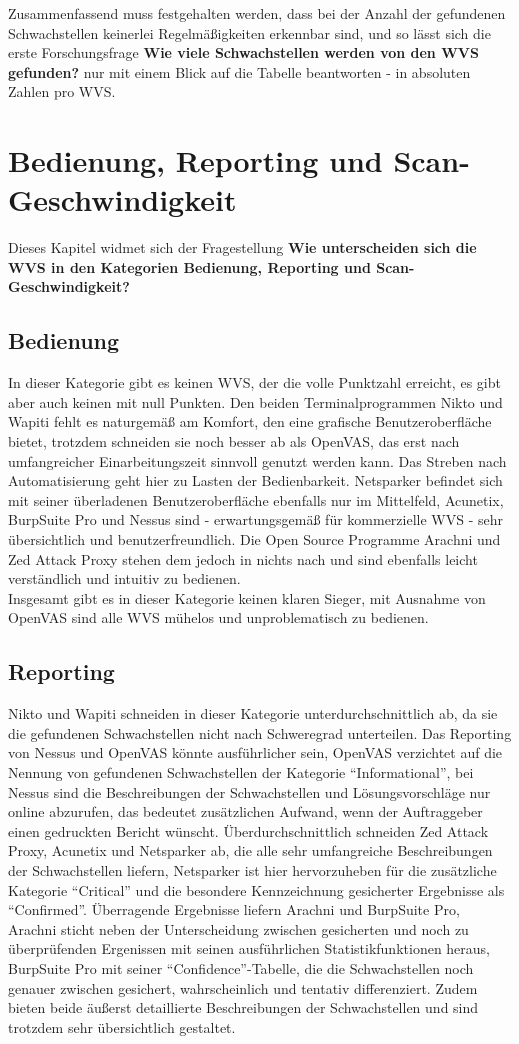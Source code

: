 \documentclass[12pt,oneside,a4paper,parskip,pointlessnumbers]{scrbook}
\begin{document}
  Zusammenfassend muss festgehalten werden, dass bei der Anzahl der gefundenen Schwachstellen keinerlei Regelmäßigkeiten erkennbar sind, und so lässt sich die erste Forschungsfrage \textbf{Wie viele Schwachstellen werden von den WVS gefunden?} nur mit einem Blick auf die Tabelle beantworten - in absoluten Zahlen pro WVS.

  \section{Bedienung, Reporting und Scan-Geschwindigkeit}
  Dieses Kapitel widmet sich der Fragestellung \textbf{Wie unterscheiden sich die WVS in den Kategorien Bedienung, Reporting und Scan-Geschwindigkeit?}
  \subsection{Bedienung}
  In dieser Kategorie gibt es keinen WVS, der die volle Punktzahl erreicht, es gibt aber auch keinen mit null Punkten. Den beiden Terminalprogrammen Nikto und Wapiti fehlt es naturgemäß am Komfort, den eine grafische Benutzeroberfläche bietet, trotzdem schneiden sie noch besser ab als OpenVAS, das erst nach umfangreicher Einarbeitungszeit sinnvoll genutzt werden kann. Das Streben nach Automatisierung geht hier zu Lasten der Bedienbarkeit. Netsparker befindet sich mit seiner überladenen Benutzeroberfläche ebenfalls nur im Mittelfeld, Acunetix, BurpSuite Pro und Nessus sind - erwartungsgemäß für kommerzielle WVS - sehr übersichtlich und benutzerfreundlich.
  Die Open Source Programme Arachni und Zed Attack Proxy stehen dem jedoch in nichts nach und sind ebenfalls leicht verständlich und intuitiv zu bedienen. \\
  Insgesamt gibt es in dieser Kategorie keinen klaren Sieger, mit Ausnahme von OpenVAS sind alle WVS mühelos und unproblematisch zu bedienen.
  \subsection{Reporting}
  Nikto und Wapiti schneiden in dieser Kategorie unterdurchschnittlich ab, da sie die gefundenen Schwachstellen nicht nach Schweregrad unterteilen. Das Reporting von Nessus und OpenVAS könnte ausführlicher sein, OpenVAS verzichtet auf die Nennung von gefundenen Schwachstellen der Kategorie ``Informational'', bei Nessus sind die Beschreibungen der Schwachstellen und Lösungsvorschläge nur online abzurufen, das bedeutet zusätzlichen Aufwand, wenn der Auftraggeber einen gedruckten Bericht wünscht.
  Überdurchschnittlich schneiden Zed Attack Proxy, Acunetix und Netsparker ab, die alle sehr umfangreiche Beschreibungen der Schwachstellen liefern, Netsparker ist hier hervorzuheben für die zusätzliche Kategorie ``Critical'' und die besondere Kennzeichnung gesicherter Ergebnisse als ``Confirmed''.
  Überragende Ergebnisse liefern Arachni und BurpSuite Pro, Arachni sticht neben der Unterscheidung zwischen gesicherten und noch zu überprüfenden Ergenissen mit seinen ausführlichen Statistikfunktionen heraus, BurpSuite Pro mit seiner ``Confidence''-Tabelle, die die Schwachstellen noch genauer zwischen gesichert, wahrscheinlich und tentativ differenziert. Zudem bieten beide äußerst detaillierte Beschreibungen der Schwachstellen und sind trotzdem sehr übersichtlich gestaltet.
\end{document}
